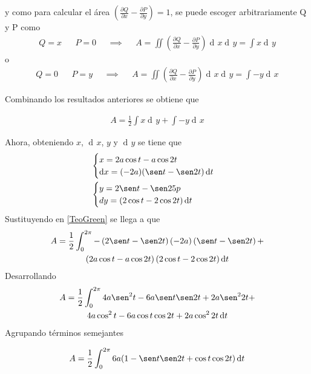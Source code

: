 \documentclass[12pt]{article}
\DeclareMathOperator{\di}{d\!}
\begin{document}
y como para calcular el área $\left( \frac{\partial Q}{\partial x} 
- \frac{\partial P}{\partial y} \right) = 1$, se puede escoger
arbitrariamente Q y P como
\begin{align*}
	Q = x && P = 0 &&\implies  &&A = \iint \left( \frac{\partial Q}{\partial x} 
	- \frac{\partial P}{\partial y} \right) \di x \di y = \int x \di y
\end{align*}
o
\begin{align*}
	Q = 0 && P = y &&\implies  &&A = \iint \left( \frac{\partial Q}{\partial x} 
	- \frac{\partial P}{\partial y} \right) \di x \di y = \int -y \di x
\end{align*}

Combinando los resultados anteriores se obtiene que 

\begin{align} \label{TeoGreen}
	A = \frac{1}{2}  \int x \di y + \int -y \di x
\end{align}

Ahora, obteniendo $x$, $\di x$, $y$ y $\di y$ se tiene que 
\begin{align*}
	&\begin{cases}
		x = 2a \cos t - a \cos 2t \\
		\di x = (-2a)(\sen t - \sen 2t) \di t
	\end{cases} \\
	&\begin{cases}
		y = 2 \sen t - \sen 25p \\
		dy = (2\cos t - 2\cos 2t)\di t
	\end{cases}
\end{align*}
Sustituyendo en \ref{TeoGreen} se llega a que 
\begin{multline*}
	A = \frac{1}{2} \int_0^{2\pi} -\left(2 \sen t - \sen 2t \right)\left(-2a
	\right)\left(\sen t - \sen 2t\right)
	+\\ \left(2a \cos t - a\cos 2t \right)\left(2 \cos t - 2 \cos 2t\right) \di t	
\end{multline*}
Desarrollando
\begin{multline*}
	A = \frac{1}{2} \int_0^{2\pi} 4a \sen^2 t - 6a \sen t \sen 2t + 2a \sen^2 2t +\\
	4a \cos^2 t - 6a \cos t \cos 2t + 2a \cos^2 2t \di t
\end{multline*}
Agrupando términos semejantes

\begin{align*}
	A = \frac{1}{2} \int_0^{2\pi} 6a (1-  \sen t\sen 2t + \cos t \cos 2t) \di t
\end{align*}
\end{document}
